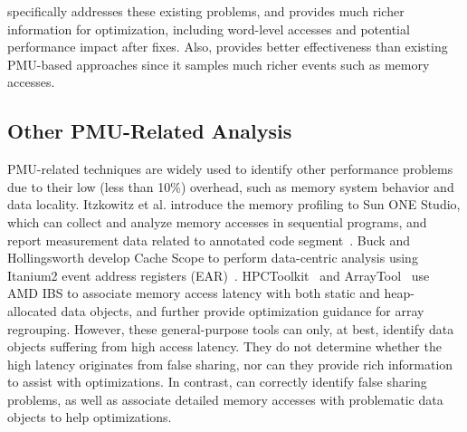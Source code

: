 \cheetah{} specifically addresses these existing problems,
and provides much richer information for optimization, including word-level accesses and potential performance impact after fixes. Also, \Cheetah{} provides better effectiveness than existing PMU-based approaches since it samples much richer events such as memory accesses. 


\subsection{Other PMU-Related Analysis}

PMU-related techniques are widely used to identify other performance problems due to their low (less than 10\%) overhead, such as memory system behavior and data locality. Itzkowitz et al. introduce the memory profiling to Sun ONE Studio, which can collect and analyze memory accesses in sequential programs, and report measurement data related to annotated code segment~\cite{DBLP:conf/sc/ItzkowitzWAK03}. Buck and Hollingsworth develop Cache Scope to perform data-centric analysis using Itanium2 event address registers (EAR)~\cite{DBLP:conf/sc/BuckH04}. HPCToolkit~\cite{ibs-sc} and ArrayTool~\cite{ibs-pact} use AMD IBS to associate memory access latency with both static and heap-allocated data objects, and further provide optimization guidance for array regrouping. However, these general-purpose tools can only, at best, identify data objects suffering from high access latency. They do not determine whether the high latency originates from false sharing, nor can they provide rich information to assist with optimizations. In contrast, \cheetah{} can correctly identify false sharing problems, as well as associate detailed memory accesses with problematic data objects to help optimizations.



